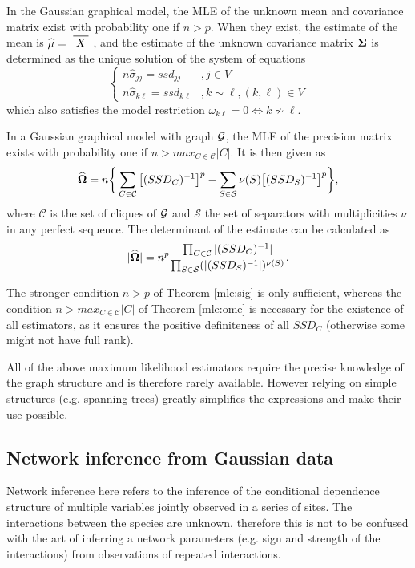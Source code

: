 \begin{theorem}\label{mle:sig}
In the Gaussian graphical model,  the MLE of the unknown mean and covariance matrix exist with probability one if $n>p$. When they exist, the estimate of the mean is $\widehat{\mu} = \xbar{X}$, and the estimate of the unknown covariance matrix ${\boldsymbol{\Sigma}}$ is determined as the unique solution of the system of equations
\begin{equation*}
 \left\{
 \begin{array}{rl}
 n\widehat{\sigma}_{jj} = ssd_{jj}&, j\in V\\
 n\widehat{\sigma}_{k\ell} = ssd_{k\ell}&, k\sim\ell, (k,\ell) \in V
 \end{array} \right.
\end{equation*}  
which also satisfies the model restriction $\omega_{k\ell} =0 \iff k\nsim \ell $.
\end{theorem}

\begin{theorem}\label{mle:ome}
In a Gaussian graphical model with graph $\mathcal{G}$, the MLE of the precision matrix exists with probability one if $n>max_{C\in\mathcal{C}}|C|$. It is then given as
$$\widehat{{\boldsymbol{\Omega}}} = n \bigg\{\sum_{C\in\mathcal{C}} \big[(SSD_C)^{-1}\big]^p-\sum_{S\in\mathcal{S}} \nu(S) \big[(SSD_S)^{-1}\big]^p\bigg\},$$
where $\mathcal{C}$ is the set of cliques of $\mathcal{G}$ and $\mathcal{S}$ the set of separators with multiplicities $\nu$ in any perfect sequence. The determinant of the estimate can be calculated as
$$|\widehat{{\boldsymbol{\Omega}}}| = n^p \dfrac{\prod_{C\in\mathcal{C}}|(SSD_C)^{-1}|}{\prod_{S\in\mathcal{S}} (|(SSD_S)^{-1}|)^{\nu(S)}}.$$
\end{theorem}
 
The stronger condition $n>p$ of Theorem \ref{mle:sig} is only sufficient, whereas the condition $n>max_{C\in\mathcal{C}}|C|$ of Theorem \ref{mle:ome} is necessary for the existence of all estimators, as it ensures the positive definiteness of all $SSD_C$ (otherwise some might not have full rank).  

 All of the above maximum likelihood estimators require the precise knowledge of the graph structure and is therefore rarely available. However relying on simple structures (e.g. spanning trees) greatly simplifies the expressions and make their use possible.

\subsection{Network inference from Gaussian data}
\label{infGGM}
  Network inference here refers to the inference of the conditional dependence structure of multiple variables jointly observed in a series of sites. The interactions between the species are unknown, therefore this is not to be confused with the art of inferring a network parameters (e.g. sign and strength of the interactions) from observations of repeated interactions.
  
